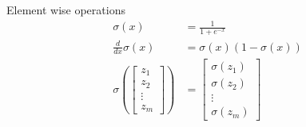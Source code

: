 \begin{frame}{Element wise operations}
	\begin{align}
	\sigma(x)  &= \frac{1}{1+e^{-x}}  \\
	\frac{d}{d x}\sigma(x) & =  \sigma(x) (1-\sigma(x)) \\
	\sigma(
		\begin{bmatrix}
			z_1 \\
			z_2 \\
			\vdots \\
			z_m
		\end{bmatrix}
	) & = 
	\begin{bmatrix}
		\sigma(z_1) \\
		\sigma(z_2) \\
		\vdots \\
		\sigma(z_m)
	\end{bmatrix}
	\end{align}
\end{frame}